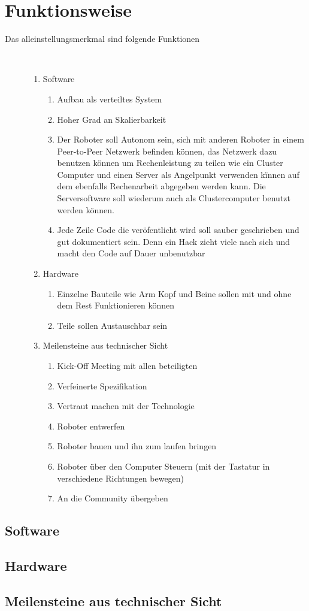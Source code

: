 \documentclass[11pt]{amsart}
\begin{document}
\section{Funktionsweise}
\begin{description}
   \item[Das alleinstellungsmerkmal sind folgende Funktionen]~\par
   \begin{enumerate}
      \item Software
      \begin{enumerate}
         \item Aufbau als verteiltes System
         \item Hoher Grad an Skalierbarkeit
         \item Der Roboter soll Autonom sein, sich mit anderen Roboter in einem Peer-to-Peer Netzwerk befinden k\"onnen, das Netzwerk dazu benutzen k\"onnen um Rechenleistung  zu teilen wie ein Cluster Computer und einen Server als Angelpunkt verwenden k\"innen auf dem ebenfalls Rechenarbeit abgegeben werden kann. Die Serversoftware soll wiederum auch als Clustercomputer benutzt werden k\"onnen.
         \item Jede Zeile Code die ver\"ofentlicht wird soll sauber geschrieben und gut dokumentiert sein. Denn ein Hack zieht viele nach sich und macht den Code auf Dauer unbenutzbar
      \end{enumerate}
      \item Hardware
         \begin{enumerate}
         \item Einzelne Bauteile wie Arm Kopf und Beine sollen mit und ohne dem Rest Funktionieren k\"onnen
         \item Teile sollen Austauschbar sein
      	\end{enumerate}
      \item Meilensteine aus technischer Sicht
      	\begin{enumerate}
	\item Kick-Off Meeting mit allen beteiligten
	\item Verfeinerte Spezifikation
	\item Vertraut machen mit der Technologie
	\item Roboter entwerfen
	\item Roboter bauen und ihn zum laufen bringen
	\item Roboter \"uber den Computer Steuern (mit der Tastatur in verschiedene Richtungen bewegen)
	\item An die Community \"ubergeben
      	\end{enumerate}
   \end{enumerate}
\end{description}
\subsection{Software}
\subsection{Hardware}
\subsection{Meilensteine aus technischer Sicht}
\end{document}

